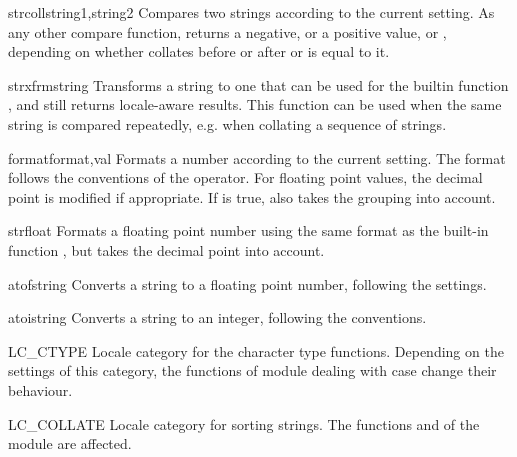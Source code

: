 \begin{funcdesc}{strcoll}{string1,string2}
Compares two strings according to the current 
setting. As any other compare function, returns a negative, or a
positive value, or , depending on whether 
collates before or after  or is equal to it.
\end{funcdesc}

\begin{funcdesc}{strxfrm}{string}
Transforms a string to one that can be used for the builtin function
, and still returns locale-aware results. This function can be
used when the same string is compared repeatedly, e.g. when collating
a sequence of strings.
\end{funcdesc}

\begin{funcdesc}{format}{format,val}
Formats a number  according to the current 
setting. The format follows the conventions of the \code{\%} operator. For
floating point values, the decimal point is modified if
appropriate. If  is true, also takes the grouping into
account.
\end{funcdesc}

\begin{funcdesc}{str}{float}
Formats a floating point number using the same format as the built-in
function , but takes the decimal point into
account.
\end{funcdesc}

\begin{funcdesc}{atof}{string}
Converts a string to a floating point number, following the 
settings.
\end{funcdesc}

\begin{funcdesc}{atoi}{string}
Converts a string to an integer, following the  conventions.
\end{funcdesc}

\begin{datadesc}{LC_CTYPE}
Locale category for the character type functions. Depending on the
settings of this category, the functions of module 
dealing with case change their behaviour.
\end{datadesc}

\begin{datadesc}{LC_COLLATE}
Locale category for sorting strings. The functions  and
 of the  module are affected.
\end{datadesc}

